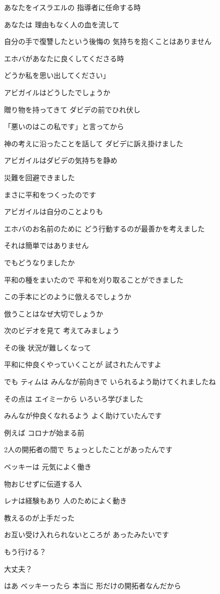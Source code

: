 \documentclass[twocolumn]{jsarticle}
\begin{document}
あなたをイスラエルの
指導者に任命する時

あなたは 理由もなく人の血を流して

自分の手で復讐したという後悔の
気持ちを抱くことはありません

エホバがあなたに良くしてくださる時

どうか私を思い出してください」

アビガイルはどうしたでしょうか

贈り物を持ってきて
ダビデの前でひれ伏し 

「悪いのはこの私です」と言ってから

神の考えに沿ったことを話して
ダビデに訴え掛けました

アビガイルはダビデの気持ちを静め

災難を回避できました

まさに平和をつくったのです

アビガイルは自分のことよりも

エホバのお名前のために
どう行動するのが最善かを考えました

それは簡単ではありません

でもどうなりましたか

平和の種をまいたので
平和を刈り取ることができました

この手本にどのように倣えるでしょうか

倣うことはなぜ大切でしょうか

次のビデオを見て 考えてみましょう

その後 状況が難しくなって

平和に仲良くやっていくことが
試されたんですよ

でも ティムは みんなが前向きで
いられるよう助けてくれましたね

その点は エイミーから
いろいろ学びました

みんなが仲良くなれるよう
よく助けていたんです

例えば コロナが始まる前

2人の開拓者の間で
ちょっとしたことがあったんです

ベッキーは 元気によく働き

物おじせずに伝道する人

レナは経験もあり 人のためによく動き

教えるのが上手だった

お互い受け入れられないところが
あったみたいです

もう行ける？

大丈夫？

はあ ベッキーったら 本当に
形だけの開拓者なんだから
\end{document}
